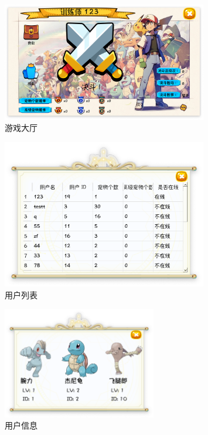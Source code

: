 \begin{figure}[H]
    \centering
    \includegraphics[width=0.8\textwidth]{home.png}
    \caption{游戏大厅}
\end{figure}

\begin{figure}[H]
    \centering
    \includegraphics[width=0.8\textwidth]{user.png}
    \caption{用户列表}
\end{figure}

\begin{figure}[H]
    \centering
    \includegraphics[width=0.6\textwidth]{info.png}
    \caption{用户信息}
\end{figure}

